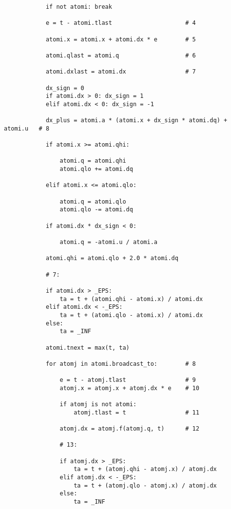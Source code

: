 \begin{lstlisting}
            if not atomi: break

            e = t - atomi.tlast                     # 4

            atomi.x = atomi.x + atomi.dx * e        # 5

            atomi.qlast = atomi.q                   # 6

            atomi.dxlast = atomi.dx                 # 7

            dx_sign = 0
            if atomi.dx > 0: dx_sign = 1
            elif atomi.dx < 0: dx_sign = -1

            dx_plus = atomi.a * (atomi.x + dx_sign * atomi.dq) + atomi.u   # 8

            if atomi.x >= atomi.qhi:

                atomi.q = atomi.qhi
                atomi.qlo += atomi.dq

            elif atomi.x <= atomi.qlo:

                atomi.q = atomi.qlo
                atomi.qlo -= atomi.dq

            if atomi.dx * dx_sign < 0:

                atomi.q = -atomi.u / atomi.a

            atomi.qhi = atomi.qlo + 2.0 * atomi.dq

            # 7:

            if atomi.dx > _EPS:
                ta = t + (atomi.qhi - atomi.x) / atomi.dx
            elif atomi.dx < -_EPS:
                ta = t + (atomi.qlo - atomi.x) / atomi.dx
            else:
                ta = _INF

            atomi.tnext = max(t, ta)

            for atomj in atomi.broadcast_to:        # 8

                e = t - atomj.tlast                 # 9
                atomj.x = atomj.x + atomj.dx * e    # 10

                if atomj is not atomi:
                    atomj.tlast = t                 # 11

                atomj.dx = atomj.f(atomj.q, t)      # 12

                # 13:

                if atomj.dx > _EPS:
                    ta = t + (atomj.qhi - atomj.x) / atomj.dx
                elif atomj.dx < -_EPS:
                    ta = t + (atomj.qlo - atomj.x) / atomj.dx
                else:
                    ta = _INF


\end{lstlisting}
